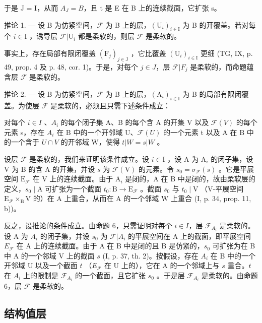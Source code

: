 于是 J = I，从而 \(A_{J} = B\)，且 t 是 E 在 B 上的连续截面，它扩张 s。

推论 1. --- 设 B 为仿紧空间，\(\mathcal{F}\) 为 B 上的层，\((\mathrm{U}_i)_{i\in \mathrm{I}}\) 为 B 的开覆盖。若对每个 \(i\in \mathrm{I}\) ，诱导层 \(\mathcal{F}|\mathrm{U}_i\) 都是柔软的，则层 \(\mathcal{F}\) 是柔软的。

事实上，存在局部有限闭覆盖 \((\mathrm{F}_{j})_{j\in\mathrm{J}}\) ，它比覆盖 \((\mathrm{U}_{i})_{i\in\mathrm{I}}\) 更细 (TG, IX, p. 49, prop. 4 及 p. 48, cor. 1)。于是，对每个 \(j\in J\)，层 \(\mathcal{F}|F_{j}\) 是柔软的，而命题蕴含层 \(\mathcal{F}\) 是柔软的。

推论 2. --- 设 B 为仿紧空间，\(\mathcal{F}\) 为 B 上的层，\((\mathrm{A}_i)_{i\in \mathrm{I}}\) 为 B 的局部有限闭覆盖。为使层 \(\mathcal{F}\) 是柔软的，必须且只需下述条件成立：

对每个 \(i \in I\) 、\(A_{i}\) 的每个闭子集 A、B 的每个含 A 的开集 V 以及 \(\mathcal{F}(V)\) 的每个元素 s，存在 \(A_{i}\) 在 B 中的一个开邻域 U、\(\mathcal{F}(U)\) 的一个元素 t 以及 A 在 B 中的一个含于 \(U \cap V\) 的开邻域 W，使得 \(t | W = s | W\) 。

设层 \(\mathcal{F}\) 是柔软的，我们来证明该条件成立。设 \(i\in\mathrm{I}\) ，设 A 为 \(\mathrm{A}_{i}\) 的闭子集，设 V 为 B 的含 A 的开集，并设 \(s\) 为 \(\mathcal{F}(\mathrm{V})\) 的元素。令 \(s_{0}=\sigma_{\mathcal{F}}(s)\) 。它是平展空间 \(\mathrm{E}_{\mathcal{F}}\) 在 V 上的连续截面。由于 \(\mathrm{A}_{i}\) 是闭的，A 在 B 中是闭的，故由柔软层的定义，\(s_{0}\mid\mathrm{A}\) 可扩张为一个截面 \(t_{0}\colon\mathrm{B}\to\mathrm{E}_{\mathcal{F}}\) 。截面 \(s_{0}\) 与 \(t_{0}\mid\mathrm{V}\) （V-平展空间 \(\mathrm{E}_{\mathcal{F}}\times_{\mathrm{B}}\mathrm{V}\) 的）在 A 上重合，从而在 A 的一个邻域 W 上重合 (I, p. 34, prop. 11, b))。

反之，设推论的条件成立。由命题 6，只需证明对每个 \(i \in I\)，层 \(\mathcal{F}_{A_i}\) 是柔软的。设 A 为 \(A_i\) 的闭子集，并设 \(s_0\) 为 \(\mathcal{F} | A_i\) 的平展空间在 A 上的截面，即平展空间 \(E_{\mathcal{F}}\) 在 A 上的连续截面。由于 A 在 B 中是闭的且 B 是仿紧的，\(s_0\) 可扩张为在 B 中 A 的一个邻域 V 上的截面 \(s\) (I, p. 37, th. 2)。按假设，存在 \(A_i\) 在 B 中的一个开邻域 U 以及一个截面 \(t\) （\(E_{\mathcal{F}}\) 在 U 上的），它在 A 的一个邻域上与 \(s\) 重合。\(t\) 在 \(A_i\) 上的限制是 \(\mathcal{F}_{A_i}\) 的一个截面，且它扩张 \(s_0\) 。于是层 \(\mathcal{F}_{A_i}\) 是柔软的。由命题 6，层 \(\mathcal{F}\) 是柔软的。

\subsection{结构值层}

